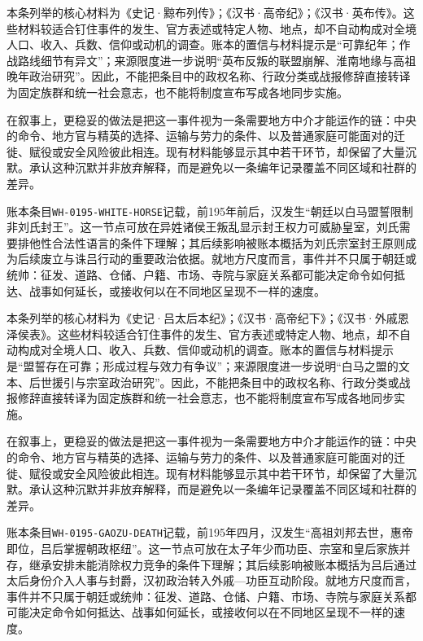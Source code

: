 本条列举的核心材料为《史记·黥布列传》；《汉书·高帝纪》；《汉书·英布传》。这些材料较适合钉住事件的发生、官方表述或特定人物、地点，却不自动构成对全境人口、收入、兵数、信仰或动机的调查。账本的置信与材料提示是“可靠纪年；作战路线细节有异文”；来源限度进一步说明“英布反叛的联盟崩解、淮南地缘与高祖晚年政治研究”。因此，不能把条目中的政权名称、行政分类或战报修辞直接转译为固定族群和统一社会意志，也不能将制度宣布写成各地同步实施。

在叙事上，更稳妥的做法是把这一事件视为一条需要地方中介才能运作的链：中央的命令、地方官与精英的选择、运输与劳力的条件、以及普通家庭可能面对的迁徙、赋役或安全风险彼此相连。现有材料能够显示其中若干环节，却保留了大量沉默。承认这种沉默并非放弃解释，而是避免以一条编年记录覆盖不同区域和社群的差异。

账本条目\texttt{WH-0195-WHITE-HORSE}记载，前195年前后，汉发生“朝廷以白马盟誓限制非刘氏封王”。这一节点可放在异姓诸侯王叛乱显示封王权力可威胁皇室，刘氏需要排他性合法性语言的条件下理解；其后续影响被账本概括为刘氏宗室封王原则成为后续废立与诛吕行动的重要政治依据。就地方尺度而言，事件并不只属于朝廷或统帅：征发、道路、仓储、户籍、市场、寺院与家庭关系都可能决定命令如何抵达、战事如何延长，或接收何以在不同地区呈现不一样的速度。

本条列举的核心材料为《史记·吕太后本纪》；《汉书·高帝纪下》；《汉书·外戚恩泽侯表》。这些材料较适合钉住事件的发生、官方表述或特定人物、地点，却不自动构成对全境人口、收入、兵数、信仰或动机的调查。账本的置信与材料提示是“盟誓存在可靠；形成过程与效力有争议”；来源限度进一步说明“白马之盟的文本、后世援引与宗室政治研究”。因此，不能把条目中的政权名称、行政分类或战报修辞直接转译为固定族群和统一社会意志，也不能将制度宣布写成各地同步实施。

在叙事上，更稳妥的做法是把这一事件视为一条需要地方中介才能运作的链：中央的命令、地方官与精英的选择、运输与劳力的条件、以及普通家庭可能面对的迁徙、赋役或安全风险彼此相连。现有材料能够显示其中若干环节，却保留了大量沉默。承认这种沉默并非放弃解释，而是避免以一条编年记录覆盖不同区域和社群的差异。

账本条目\texttt{WH-0195-GAOZU-DEATH}记载，前195年四月，汉发生“高祖刘邦去世，惠帝即位，吕后掌握朝政枢纽”。这一节点可放在太子年少而功臣、宗室和皇后家族并存，继承安排未能消除权力竞争的条件下理解；其后续影响被账本概括为吕后通过太后身份介入人事与封爵，汉初政治转入外戚—功臣互动阶段。就地方尺度而言，事件并不只属于朝廷或统帅：征发、道路、仓储、户籍、市场、寺院与家庭关系都可能决定命令如何抵达、战事如何延长，或接收何以在不同地区呈现不一样的速度。

